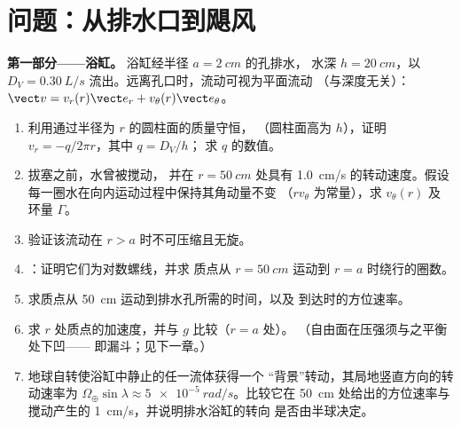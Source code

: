 \section{问题：从排水口到飓风}

\begin{problem}
\label{pb:b2:fluid-kinematics:1}

\medskip
\noindent\textbf{第一部分——浴缸。}
浴缸经半径 $a = \qty{2}{cm}$ 的孔排水，
水深 $h = \qty{20}{cm}$，以 $D_V =
\qty{0.30}{L/s}$ 流出。远离孔口时，流动可视为平面流动
（与深度无关）：$\vect v = v_r(r)\vect e_r + v_\theta(r)\vect e_\theta$。
\begin{enumerate}
  \item 利用通过半径为 $r$ 的圆柱面的质量守恒，
        （圆柱面高为 $h$），证明 $v_r = -q/2\pi r$，其中 $q = D_V/h$；
        求 $q$ 的数值。
  \item 拔塞之前，水曾被搅动，
        并在 $r = \qty{50}{cm}$ 处具有 \qty{1.0}{cm/s} 的转动速度。假设
        每一圈水在向内运动过程中保持其角动量不变
        （$rv_\theta$ 为常量），求 $v_\theta(r)$ 及
        环量 $\Gamma$。
  \item 验证该流动在
        $r > a$ 时不可压缩且无旋。
  \item {}：证明它们为对数螺线，并求
        质点从 $r = \qty{50}{cm}$ 运动到
        $r = a$ 时绕行的圈数。
  \item 求质点从 \qty{50}{cm} 运动到排水孔所需的时间，以及
        到达时的方位速率。
  \item 求 $r$ 处质点的加速度，并与 $g$ 比较（$r = a$ 处）。
        （自由面在压强须与之平衡处下凹——
        即漏斗；见下一章。）
  \item 地球自转使浴缸中静止的任一流体获得一个
        “背景”转动，其局地竖直方向的转动速率为
        $\Omega_\oplus\sin\lambda \approx \qty{5e-5}{rad/s}$。比较它在
        \qty{50}{cm} 处给出的方位速率与搅动产生的
        \qty{1}{cm/s}，并说明排水浴缸的转向
        是否由半球决定。
\end{enumerate}


\end{problem}
